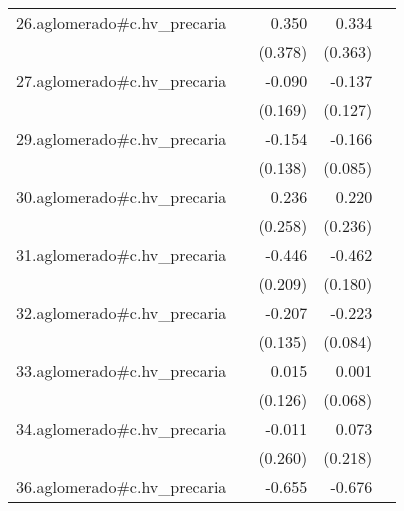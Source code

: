 {\begin{longtable}{l*{4}{D{.}{.}{-1}}}
\addlinespace
26.aglomerado#c.hv\_precaria&                     &       0.350         &       0.334         &                     \\
            &                     &     (0.378)         &     (0.363)         &                     \\
\addlinespace
27.aglomerado#c.hv\_precaria&                     &      -0.090         &      -0.137         &                     \\
            &                     &     (0.169)         &     (0.127)         &                     \\
\addlinespace
29.aglomerado#c.hv\_precaria&                     &      -0.154         &      -0.166         &                     \\
            &                     &     (0.138)         &     (0.085)         &                     \\
\addlinespace
30.aglomerado#c.hv\_precaria&                     &       0.236         &       0.220         &                     \\
            &                     &     (0.258)         &     (0.236)         &                     \\
\addlinespace
31.aglomerado#c.hv\_precaria&                     &      -0.446\sym{*}  &      -0.462\sym{*}  &                     \\
            &                     &     (0.209)         &     (0.180)         &                     \\
\addlinespace
32.aglomerado#c.hv\_precaria&                     &      -0.207         &      -0.223\sym{**} &                     \\
            &                     &     (0.135)         &     (0.084)         &                     \\
\addlinespace
33.aglomerado#c.hv\_precaria&                     &       0.015         &       0.001         &                     \\
            &                     &     (0.126)         &     (0.068)         &                     \\
\addlinespace
34.aglomerado#c.hv\_precaria&                     &      -0.011         &       0.073         &                     \\
            &                     &     (0.260)         &     (0.218)         &                     \\
\addlinespace
36.aglomerado#c.hv\_precaria&                     &      -0.655\sym{**} &      -0.676\sym{***}&                     \\

\end{longtable}}
